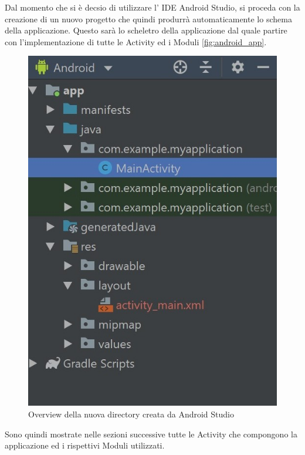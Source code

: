 Dal momento che si è decsio di utilizzare l' IDE Android Studio, si proceda con la creazione di un nuovo progetto che quindi produrrà automaticamente lo schema della applicazione. Questo sarà lo scheletro della applicazione dal quale partire con l'implementazione di tutte le Activity ed i Moduli \autoref{fig:android_app}.
\begin{figure}
	\begin{center}
		\includegraphics[width=0.3\columnwidth]{images/android_app}
	\end{center}
	\caption{Overview della nuova directory creata da Android Studio}
	\label{fig:android_app}
\end{figure}
Sono quindi mostrate nelle sezioni successive tutte le Activity che compongono la applicazione ed i rispettivi Moduli utilizzati.

